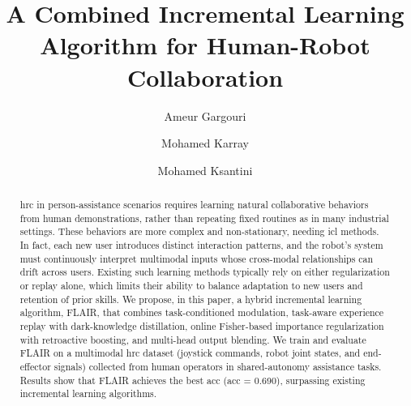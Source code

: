 \documentclass[3p,times,procedia]{elsarticle}
\begin{document}
\begin{frontmatter}


\title{A Combined Incremental Learning Algorithm for Human-Robot Collaboration}


\author[a,b]{Ameur Gargouri}
\author[b]{Mohamed Karray}
\author[a]{Mohamed Ksantini}

\address[a]{ATISP Lab, ENET'Com, University of Sfax, Sfax, Tunisia}
\address[b]{ESME Research Lab, Ivry-sur-Seine, France}

\begin{abstract}
\ac{hrc} in person-assistance scenarios requires learning natural collaborative behaviors from human demonstrations, rather than repeating fixed routines as in many industrial settings. These behaviors are more complex and non-stationary, needing \ac{icl} methods. In fact, each new user introduces distinct interaction patterns, and the robot's system must continuously interpret multimodal inputs whose cross-modal relationships can drift across users. Existing such learning methods typically rely on either regularization or replay alone, which limits their ability to balance adaptation to new users and retention of prior skills. We propose, in this paper, a hybrid incremental learning algorithm, FLAIR, that combines task-conditioned modulation, task-aware experience replay with dark-knowledge distillation, online Fisher-based importance regularization with retroactive boosting, and multi-head output blending. We train and evaluate FLAIR on a multimodal \ac{hrc} dataset (joystick commands, robot joint states, and end-effector signals) collected from human operators in shared-autonomy assistance tasks. Results show that FLAIR achieves the best \ac{acc} (\ac{acc} = 0.690), surpassing existing incremental learning algorithms.
\end{abstract}


\end{frontmatter}
\end{document}

